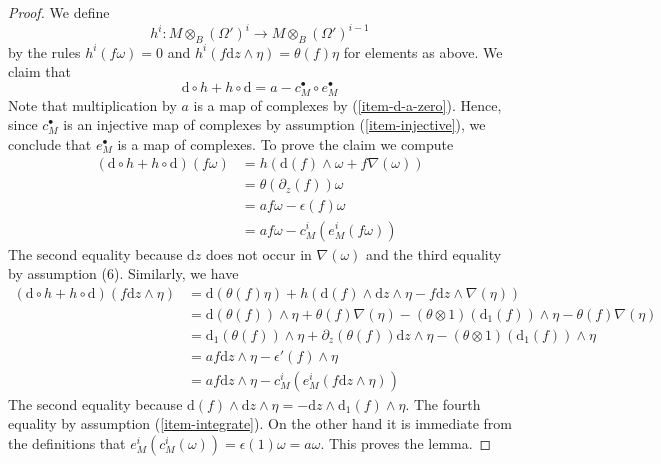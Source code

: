 \begin{proof}
\medskip\noindent
We define
$$
h^i : M \otimes_B (\Omega')^i \longrightarrow M \otimes_B (\Omega')^{i - 1}
$$
by the rules $h^i(f \omega) = 0$ and
$h^i(f \text{d}z \wedge \eta) = \theta(f) \eta$
for elements as above.  We claim that
$$
\text{d} \circ h + h \circ \text{d} = a - c_M^\bullet \circ e_M^\bullet
$$
Note that multiplication by $a$ is a map of complexes
by (\ref{item-d-a-zero}). Hence, since $c_M^\bullet$ is an injective map
of complexes by assumption (\ref{item-injective}), we conclude that
$e_M^\bullet$ is a map of complexes. To prove the claim we compute
\begin{align*}
(\text{d} \circ h + h \circ \text{d})(f \omega)
& =
h\left(\text{d}(f) \wedge \omega + f \nabla(\omega)\right)
\\
& =
\theta(\partial_z(f)) \omega
\\
& =
a f\omega - \epsilon(f)\omega
\\
& =
a f \omega - c^i_M(e^i_M(f\omega))
\end{align*}
The second equality because $\text{d}z$ does not occur in $\nabla(\omega)$
and the third equality by assumption (6). Similarly, we have
\begin{align*}
(\text{d} \circ h + h \circ \text{d})(f \text{d}z \wedge \eta)
& =
\text{d}(\theta(f) \eta) +
h\left(\text{d}(f) \wedge \text{d}z \wedge \eta -
f \text{d}z \wedge \nabla(\eta)\right)
\\
& =
\text{d}(\theta(f)) \wedge \eta + \theta(f) \nabla(\eta)
- (\theta \otimes 1)(\text{d}_1(f)) \wedge \eta
- \theta(f) \nabla(\eta)
\\
& =
\text{d}_1(\theta(f)) \wedge \eta +
\partial_z(\theta(f)) \text{d}z \wedge \eta -
(\theta \otimes 1)(\text{d}_1(f)) \wedge \eta
\\
& =
a f \text{d}z \wedge \eta - \epsilon'(f) \wedge \eta \\
& = a f \text{d}z \wedge \eta - c^i_M(e^i_M(f \text{d}z \wedge \eta))
\end{align*}
The second equality because
$\text{d}(f) \wedge \text{d}z \wedge \eta =
- \text{d}z \wedge \text{d}_1(f) \wedge \eta$.
The fourth equality by assumption (\ref{item-integrate}).
On the other hand it is immediate from the definitions
that $e^i_M(c^i_M(\omega)) = \epsilon(1) \omega = a \omega$.
This proves the lemma.
\end{proof}

